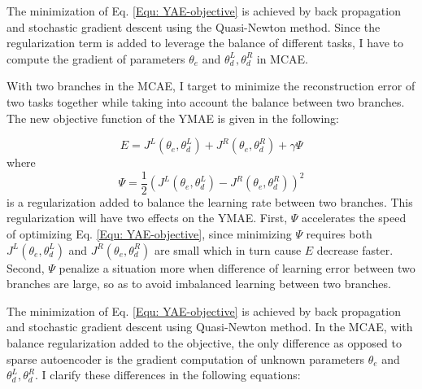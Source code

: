 \documentclass{iitthesis}
\begin{document}
The minimization of Eq. \ref{Equ: YAE-objective} is achieved by back propagation and stochastic gradient descent using the Quasi-Newton method. Since the regularization term is added to leverage the balance of different tasks, I have to compute the gradient of parameters $\theta_{e}$ and $\theta_{d}^{L},\theta_{d}^{R}$ in MCAE. 

With two branches in the MCAE, I target to minimize the reconstruction error of two tasks together while taking into account the balance between two branches. The new objective function of the YMAE is given in the following:

\begin{equation}
E=J^{L}(\theta_{e},\theta_{d}^{L})+J^{R}(\theta_{e},\theta_{d}^{R})+\gamma\Psi\label{Equ: YAE-objective}
\end{equation}
where 
\begin{equation}
\Psi=\frac{1}{2}(J^{L}(\theta_{e},\theta_{d}^{L})-J^{R}(\theta_{e},\theta_{d}^{R}))^{2}
\end{equation}
is a regularization added to balance the learning rate between two branches. This regularization will have two effects on the YMAE. First, $\Psi$ accelerates the speed of optimizing Eq. \ref{Equ: YAE-objective}, since minimizing $\Psi$ requires both $J^{L}(\theta_{e},\theta_{d}^{L})$ and $J^{R}(\theta_{e},\theta_{d}^{R})$ are small which in turn cause $E$ decrease faster. Second, $\Psi$ penalize a situation more when difference of learning error between two branches are large, so as to avoid imbalanced learning between two branches.

The minimization of Eq. \ref{Equ: YAE-objective} is achieved by back propagation and stochastic gradient descent using Quasi-Newton method. In the MCAE, with balance regularization added to the objective, the only difference as opposed to sparse autoencoder is the gradient computation of unknown parameters $\theta_{e}$ and $\theta_{d}^{L},\theta_{d}^{R}$. I clarify these differences in the following equations:
\end{document}
